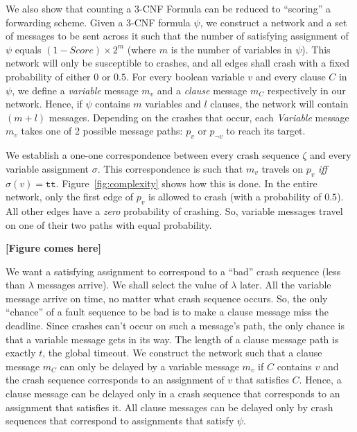 \documentclass[11pt,eepic]{article}
\renewcommand{\tt}{\texttt{tt}}
\begin{document}
	We also show that counting a 3-CNF Formula can be reduced to ``scoring'' a forwarding scheme. Given a 3-CNF formula $\psi$, we construct a network and a set of messages to be sent across it such that the number of satisfying assignment of $\psi$ equals $(1-Score)\times 2^m$ (where $m$ is the number of variables in $\psi$). This network will only be susceptible to crashes, and all edges shall crash with a fixed probability of either $0$ or $0.5$. For every boolean variable $v$ and every clause $C$ in $\psi$, we define a {\it variable} message $m_v$ and a {\it clause} message $m_C$ respectively in our network. Hence, if $\psi$ contains $m$ variables and $l$ clauses, the network will contain $(m+l)$ messages. Depending on the crashes that occur, each {\it Variable} message $m_v$ takes one of 2 possible message paths: $p_v$ or $p_{\neg v}$ to reach its target.

	We establish a one-one correspondence between every crash sequence $\zeta$ and every variable assignment $\sigma$. This correspondence is such that $m_v$ travels on $p_v$ {\it iff} $\sigma(v) = \tt$. Figure~\ref{fig:complexity} shows how this is done. In the entire network, only the first edge of $p_v$ is allowed to crash (with a probability of $0.5$). All other edges have a {\it zero} probability of crashing. So, variable messages travel on one of their two paths with equal probability.

	{\bf [Figure comes here]}

	We want a satisfying assignment to correspond to a ``bad'' crash sequence (less than $\lambda$ messages arrive). We shall select the value of $\lambda$ later. All the variable message arrive on time, no matter what crash sequence occurs. So, the only ``chance'' of a fault sequence to be bad is to make a clause message miss the deadline. Since crashes can't occur on such a message's path, the only chance is that a variable message gets in its way. The length of a clause message path is exactly $t$, the global timeout. We construct the network such that a clause message $m_C$ can only be delayed by a variable message $m_v$ if $C$ contains $v$ and the crash sequence corresponds to an assignment of $v$ that satisfies $C$. Hence, a clause message can be delayed only in a crash sequence that corresponds to an assignment that satisfies it. All clause messages can be delayed only by crash sequences that correspond to assignments that satisfy $\psi$.
\end{document}
